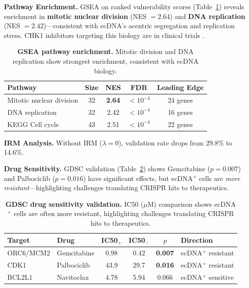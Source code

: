 \documentclass{article}
\begin{document}
\textbf{Pathway Enrichment.} GSEA \citep{subramanian_2005_gsea} on ranked vulnerability scores (Table~\ref{tab:gsea}) reveals enrichment in \textbf{mitotic nuclear division} (NES $= 2.64$) and \textbf{DNA replication} (NES $= 2.42$)---consistent with ecDNA's acentric segregation and replication stress. CHK1 inhibitors targeting this biology are in clinical trials \citep{yi_2024_chk1_ecdna}.

\begin{table}[h]
\caption{\textbf{GSEA pathway enrichment.} Mitotic division and DNA replication show strongest enrichment, consistent with ecDNA biology.}
\label{tab:gsea}
\centering
\small
\begin{tabular}{@{}lcccc@{}}
\toprule
Pathway & Size & NES & FDR & Leading Edge \\
\midrule
Mitotic nuclear division & 32 & \textbf{2.64} & $<10^{-4}$ & 24 genes \\
DNA replication & 32 & 2.42 & $<10^{-4}$ & 16 genes \\
KEGG Cell cycle & 43 & 2.51 & $<10^{-4}$ & 22 genes \\
\bottomrule
\end{tabular}
\end{table}

\textbf{IRM Analysis.} Without IRM ($\lambda = 0$), validation rate drops from 29.8\% to 14.6\%.

\textbf{Drug Sensitivity.} GDSC validation (Table~\ref{tab:gdsc_main}) shows Gemcitabine ($p = 0.007$) and Palbociclib ($p = 0.016$) have significant effects, but ecDNA$^+$ cells are \textit{more resistant}---highlighting challenges translating CRISPR hits to therapeutics.

\begin{table}[h]
\caption{\textbf{GDSC drug sensitivity validation.} IC50 ($\mu$M) comparison shows ecDNA$^+$ cells are often more resistant, highlighting challenges translating CRISPR hits to therapeutics.}
\label{tab:gdsc_main}
\centering
\small
\begin{tabular}{@{}llcccl@{}}
\toprule
Target & Drug & IC50$_{+}$ & IC50$_{-}$ & $p$ & Direction \\
\midrule
ORC6/MCM2 & Gemcitabine & 0.98 & 0.42 & \textbf{0.007} & ecDNA$^+$ resistant \\
CDK1 & Palbociclib & 43.9 & 29.7 & \textbf{0.016} & ecDNA$^+$ resistant \\
BCL2L1 & Navitoclax & 4.78 & 5.94 & 0.066 & ecDNA$^+$ sensitive \\
\bottomrule
\end{tabular}
\end{table}
\end{document}
